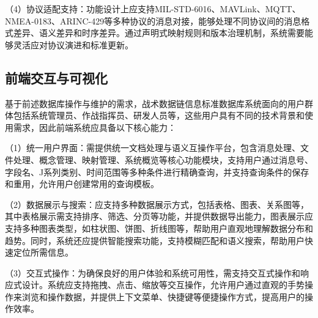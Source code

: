 \begin{table}[!htb]
    \caption{系统API接口功能表}
    \label{table_api_interfaces}
    \centering
\end{table}

（4）协议适配支持：功能设计上应支持MIL-STD-6016、MAVLink、MQTT、NMEA-0183、ARINC-429等多种协议的消息对接，能够处理不同协议间的消息格式差异、语义差异和时序差异。通过声明式映射规则和版本治理机制，系统需要能够灵活应对协议演进和标准更新。


\subsection{前端交互与可视化}
基于前述数据库操作与维护的需求，战术数据链信息标准数据库系统面向的用户群体包括系统管理员、作战指挥员、研发人员等，这些用户具有不同的技术背景和使用需求，因此前端系统应具备以下核心能力：

（1）统一用户界面：需提供统一文档处理与语义互操作平台，包含消息处理、文件处理、概念管理、映射管理、系统概览等核心功能模块，支持用户通过消息号、字段名、J系列类别、时间范围等多种条件进行精确查询，并支持查询条件的保存和重用，允许用户创建常用的查询模板。

（2）数据展示与搜索：应支持多种数据展示方式，包括表格、图表、关系图等，其中表格展示需支持排序、筛选、分页等功能，并提供数据导出能力，图表展示应支持多种图表类型，如柱状图、饼图、折线图等，帮助用户直观地理解数据分布和趋势。同时，系统还应提供智能搜索功能，支持模糊匹配和语义搜索，帮助用户快速定位所需信息。

（3）交互式操作：为确保良好的用户体验和系统可用性，需支持交互式操作和响应式设计。系统应支持拖拽、点击、缩放等交互操作，允许用户通过直观的手势操作来浏览和操作数据，并提供上下文菜单、快捷键等便捷操作方式，提高用户的操作效率。

